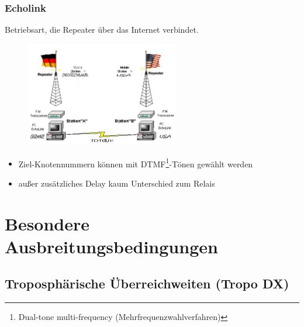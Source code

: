 \begin{frame}
  \frametitle{Echolink}

  Betriebsart, die Repeater über das Internet verbindet.

  \begin{center}
    \begin{figure}
      \includegraphics[width=0.6\textwidth,height=.45\textheight,keepaspectratio]{bv11/Echolink.jpg}
    \end{figure}
  \end{center}

  \begin{itemize}
    \item Ziel-Knotennummern können mit DTMF\footnote{Dual-tone multi-frequency
      (Mehrfrequenzwahlverfahren)}-Tönen gewählt werden
    \item außer zusätzliches Delay kaum Unterschied zum Relais
  \end{itemize}

\end{frame}

\section[Ausbreitungsbed.]{Besondere Ausbreitungsbedingungen}

\subsection[Tropo DX]{Troposphärische Überreichweiten (Tropo DX)}

